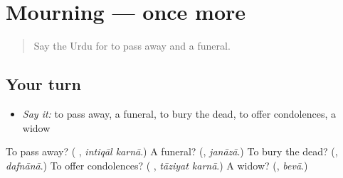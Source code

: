 \section[(dialogue)]{Mourning — once more}

\label{lesson:UR-R493-review-final-493}



\begin{quote}
Say the Urdu for to pass away and a funeral.
\end{quote}

\subsection*{Your turn}
\begin{itemize}
\raggedright
  \item \emph{Say it:} to pass away, a funeral, to bury the dead, to offer condolences, a widow
\end{itemize}

\begin{tcolorbox}[breakable,colback=teal!4,colframe=teal!35!black,title={Before you move on}]
To pass away? (\textbf{ }, \emph{intiqāl karnā}.) A funeral? (\textbf{}, \emph{janāzā}.) To bury the dead? (\textbf{}, \emph{dafnānā}.) To offer condolences? (\textbf{ }, \emph{tāziyat karnā}.) A widow? (\textbf{}, \emph{bevā}.)
\end{tcolorbox}
